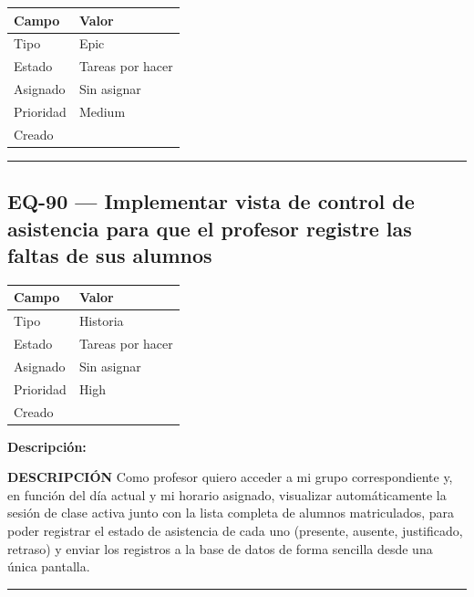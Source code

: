 \documentclass[
  spanish,
  11pt,
]{report}
\newcounter{none} %
\begin{document}
{\def\LTcaptype{none} %
\begin{longtable}[]{@{}ll@{}}
\toprule\noalign{}
Campo & Valor \\
\midrule\noalign{}
\endhead
\bottomrule\noalign{}
\endlastfoot
Tipo & Epic \\
Estado & Tareas por hacer \\
Asignado & Sin asignar \\
Prioridad & Medium \\
Creado & \\
\end{longtable}
}

\begin{center}\rule{0.5\linewidth}{0.5pt}\end{center}

\subsection{EQ-90 --- Implementar vista de control de asistencia para
que el profesor registre las faltas de sus
alumnos}\label{eq-90-implementar-vista-de-control-de-asistencia-para-que-el-profesor-registre-las-faltas-de-sus-alumnos}

{\def\LTcaptype{none} %
\begin{longtable}[]{@{}ll@{}}
\toprule\noalign{}
Campo & Valor \\
\midrule\noalign{}
\endhead
\bottomrule\noalign{}
\endlastfoot
Tipo & Historia \\
Estado & Tareas por hacer \\
Asignado & Sin asignar \\
Prioridad & High \\
Creado & \\
\end{longtable}
}

\textbf{Descripción:}

\textbf{DESCRIPCIÓN} Como profesor quiero acceder a mi grupo
correspondiente y, en función del día actual y mi horario asignado,
visualizar automáticamente la sesión de clase activa junto con la lista
completa de alumnos matriculados, para poder registrar el estado de
asistencia de cada uno (presente, ausente, justificado, retraso) y
enviar los registros a la base de datos de forma sencilla desde una
única pantalla.

\begin{center}\rule{0.5\linewidth}{0.5pt}\end{center}
\end{document}
